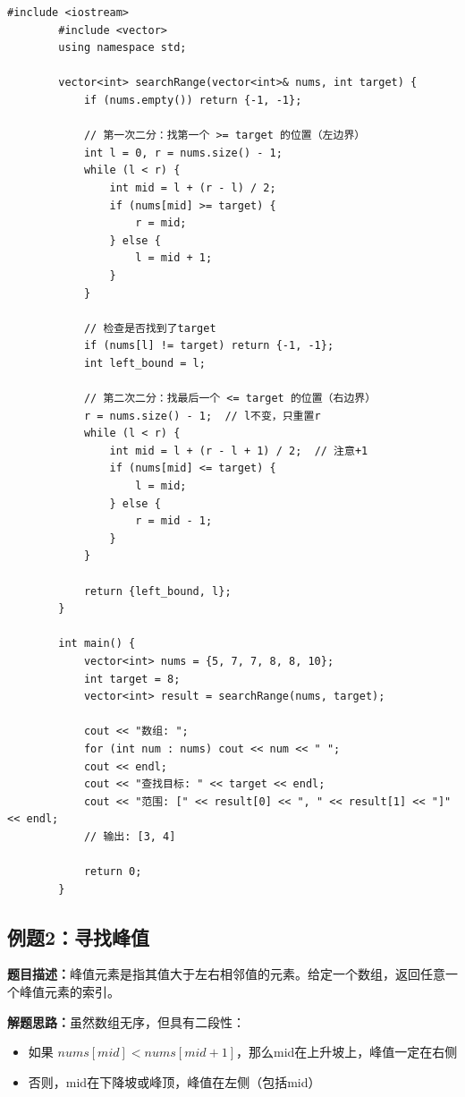 \documentclass[12pt,a4paper]{article}
\begin{document}
	\begin{lstlisting}[caption={例题1：查找元素的起始和结束位置}]
		#include <iostream>
		#include <vector>
		using namespace std;
		
		vector<int> searchRange(vector<int>& nums, int target) {
			if (nums.empty()) return {-1, -1};
			
			// 第一次二分：找第一个 >= target 的位置（左边界）
			int l = 0, r = nums.size() - 1;
			while (l < r) {
				int mid = l + (r - l) / 2;
				if (nums[mid] >= target) {
					r = mid;
				} else {
					l = mid + 1;
				}
			}
			
			// 检查是否找到了target
			if (nums[l] != target) return {-1, -1};
			int left_bound = l;
			
			// 第二次二分：找最后一个 <= target 的位置（右边界）
			r = nums.size() - 1;  // l不变，只重置r
			while (l < r) {
				int mid = l + (r - l + 1) / 2;  // 注意+1
				if (nums[mid] <= target) {
					l = mid;
				} else {
					r = mid - 1;
				}
			}
			
			return {left_bound, l};
		}
		
		int main() {
			vector<int> nums = {5, 7, 7, 8, 8, 10};
			int target = 8;
			vector<int> result = searchRange(nums, target);
			
			cout << "数组: ";
			for (int num : nums) cout << num << " ";
			cout << endl;
			cout << "查找目标: " << target << endl;
			cout << "范围: [" << result[0] << ", " << result[1] << "]" << endl;
			// 输出: [3, 4]
			
			return 0;
		}
	\end{lstlisting}
	
	\subsection{例题2：寻找峰值}
	
	\textbf{题目描述：}峰值元素是指其值大于左右相邻值的元素。给定一个数组，返回任意一个峰值元素的索引。
	
	\textbf{解题思路：}虽然数组无序，但具有二段性：
	\begin{itemize}
		\item 如果 $nums[mid] < nums[mid+1]$，那么mid在上升坡上，峰值一定在右侧
		\item 否则，mid在下降坡或峰顶，峰值在左侧（包括mid）
	\end{itemize}
	
\end{document}
